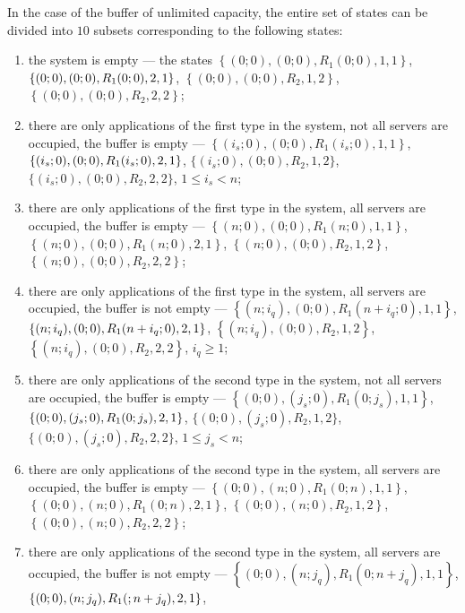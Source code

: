 \documentclass[default]{subfiles}
\begin{document}
{In the case of the buffer of unlimited capacity, the entire set of
states can be divided into $10$ subsets corresponding to the following
states:
\begin{enumerate}
\item the system is empty --- the
  states $\left\{(0; 0),(0; 0), R_1(0;0),1,1\right\}$,
  $\{(0; 0),(0; 0), R_1(0;0),\\* 2,1\}$,
  $\left\{(0; 0),(0; 0), R_2,1,2\right\}$,
  $\left\{(0; 0),(0; 0), R_2,2,2\right\}$;
\item there are only applications of the first type in the system, not
  all servers are occupied, the buffer is empty ---
  $\left\{(i_s; 0),(0; 0), R_1(i_s;0),1,1\right\}$,
  $\{(i_s; 0),(0; 0), R_1(i_s;0),\\* 2,1\}$,
  $\{(i_s; 0),(0; 0), R_2,1,2\}$, $\{(i_s; 0),(0; 0), R_2,2,2\}$,
  $1\leqslant  i_s < n$;
\item there are only applications of the first type in the system, all
  servers are occupied, the buffer is empty ---
  $\left\{(n; 0),(0; 0), R_1(n;0),1,1\right\}$,
  $\left\{(n; 0),(0; 0), R_1(n;0),2,1\right\}$,
  $\left\{(n; 0),(0; 0), R_2,1,2\right\}$,
  $\left\{(n; 0),(0; 0), R_2,2,2\right\}$;
\item there are only applications of the first type in the system, all
  servers are occupied, the buffer is not empty ---
  $\left\{(n; i_q),(0; 0), R_1(n+i_q;0),1,1\right\}$,
  $\{(n; i_q),(0; 0), \\*R_1(n+i_q;0),2,1\}$,
  $\left\{(n; i_q),(0; 0), R_2,1,2\right\}$,
  $\left\{(n; i_q),(0; 0), R_2,2,2\right\}$, $i_q\geqslant  1$;
\item there are only applications of the second type in the system,
  not all servers are occupied, the buffer is empty ---
  $\left\{(0; 0),(j_s; 0), R_1(0;j_s),1,1\right\}$,
  $\{(0; 0),(j_s; 0), R_1(0;j_s),\\* 2,1\}$,
  $\{(0; 0),(j_s; 0), R_2,1,2\}$, $\{(0; 0),(j_s; 0), R_2,2,2\}$,
  $1\leqslant  j_s <n$;
\item there are only applications of the second type in the system,
  all servers are occupied, the buffer is empty ---
  $\left\{(0; 0),(n; 0), R_1(0;n),1,1\right\}$,
  $\left\{(0; 0),(n; 0), R_1(0;n),2,1\right\}$,
  $\left\{(0; 0),(n; 0), R_2,1,2\right\}$,
  $\left\{(0; 0),(n; 0), R_2,2,2\right\}$;
\item there are only applications of the second type in the system,
  all servers are occupied, the buffer is not empty ---
  $\left\{(0; 0),(n; j_q), R_1(0;n+j_q),1,1\right\}$,
  $\{(0; 0),(n; j_q), \\*R_1(;n+j_q),2,1\}$,

\end{enumerate}}
\end{document}
